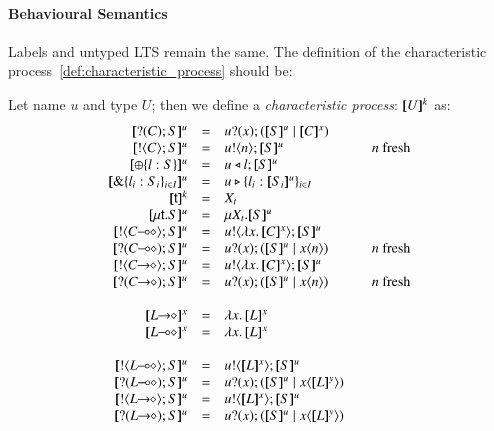 
\paragraph{Behavioural Semantics}

Labels and untyped LTS remain the same. The definition of the
characteristic process~\ref{def:characteristic_process} should be:
%
\begin{definition}\rm
	Let name $u$ and type $U$; then we define a {\em characteristic process}:
	$[\!\![U]\!\!]^k$ as:
%
	\[
	\begin{array}{rclcl}
		\map{\btinp{C} S}^{u} &=& \binp{u}{x} (\map{S}^{u} \Par \map{C}^{x})
		\\
		\map{\btout{C} S}^{u} &=& \bout{u}{n} \map{S}^{u} & & n \textrm{ fresh}
		\\
		\map{\btsel{l : S}}^{u} &=& \bsel{u}{l} \map{S}^{u}
		\\
		\map{\btbra{l_i: S_i}_{i \in I}}^{u} &=& \bbra{u}{l_i: \map{S_i}^{u}}_{i \in I}
		\\
		\map{\tvar{t}}^{k} &=& \varp{X}_t
		\\
		\map{\trec{t}{S}}^{u} &=& \recp{X_t}{\map{S}^{u}}
		\\
		\map{\btout{\lhot{C}} S}^{u} &=& \bout{u}{\abs{x}{\map{C}^{x}}} \map{S}^u
		\\
		\map{\btinp{\lhot{C}} S}^{u} &=& \binp{u}{x} (\map{S}^u \Par \appl{x}{n}) & & n \textrm{ fresh}
		\\
		\map{\btout{\shot{C}} S}^{u} &=& \bout{u}{\abs{x}{\map{C}^{x}}} \map{S}^u
		\\
		\map{\btinp{\shot{C}} S}^{u} &=& \binp{u}{x} (\map{S}^u \Par \appl{x}{n}) & & n \textrm{ fresh}
		\\
		\\
		\map{\shot{L}}^x &=& \abs{x}{\map{L}^x}
		\\
		\map{\lhot{L}}^x &=& \abs{x}{\map{L}^x}
		\\
		\\

		\map{\btout{\lhot{L}} S}^{u} &=& \bout{u}{\map{L}^x} \map{S}^u
		\\
		\map{\btinp{\lhot{L}} S}^{u} &=& \binp{u}{x} (\map{S}^u \Par \appl{x}{\map{L}^y}) %
		\\
		\map{\btout{\shot{L}} S}^{u} &=& \bout{u}{\map{L}^x} \map{S}^u
		\\
		\map{\btinp{\shot{L}} S}^{u} &=& \binp{u}{x} (\map{S}^u \Par \appl{x}{\map{L}^y}) %
		\\
		\\


\end{array}\]
\end{definition}
